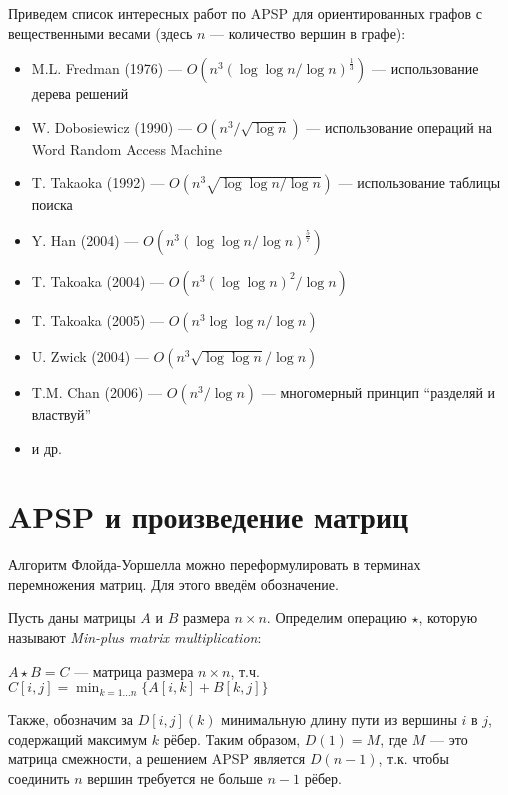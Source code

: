 \begin{remark}
Приведем список интересных работ по APSP для ориентированных графов с вещественными весами (здесь $n$ --- количество вершин в графе):
\begin{itemize}
    \item M.L. Fredman (1976) --- $O(n^3(\log \log n / \log n)^\frac{1}{3})$ --- использование дерева решений~\cite{FredmanAPSP1976}
    \item W. Dobosiewicz (1990) --- $O(n^3 / \sqrt{\log n})$ --- использование операций на Word Random Access Machine~\cite{Dobosiewicz1990}
    \item T. Takaoka (1992) --- $O(n^3 \sqrt{\log \log n / \log n})$ --- использование таблицы поиска~\cite{Takaoka1992}
    \item Y. Han (2004) --- $O(n^3 (\log \log n / \log n)^\frac{5}{7})$~\cite{Han2004}
    \item T. Takoaka (2004) --- $O(n^3 (\log \log n)^2 / \log n)$~\cite{Takaoka2004}
    \item T. Takoaka (2005) --- $O(n^3 \log \log n / \log n)$~\cite{Takaoka2005}
    \item U. Zwick (2004) --- $O(n^3 \sqrt{\log \log n} / \log n)$~\cite{Zwick2004}
    \item T.M. Chan (2006) --- $O(n^3 / \log n)$ --- многомерный принцип ``разделяй и властвуй''~\cite{Chan2008}
    \item и др.
\end{itemize}
\end{remark}

\section{APSP и произведение матриц}
Алгоритм Флойда-Уоршелла можно переформулировать в терминах перемножения матриц. Для этого введём обозначение.


\begin{definition}
Пусть даны матрицы $A$ и $B$ размера $n \times n$. Определим операцию $\star$, которую называют \textit{Min-plus matrix multiplication}:

    $A \star B = C$ --- матрица размера $n \times n$, т.ч.
    $C[i,j] = \min_{k = 1 \dots n} \{ A[i,k] + B[k,j] \}$
\end{definition}

Также, обозначим за $D[i,j](k)$ минимальную длину пути из вершины $i$ в $j$, содержащий максимум $k$ рёбер.
Таким образом, $D(1) = M$, где $M$ --- это матрица смежности, а решением APSP является $D(n-1)$, т.к. чтобы соединить $n$ вершин требуется не больше $n-1$ рёбер.

